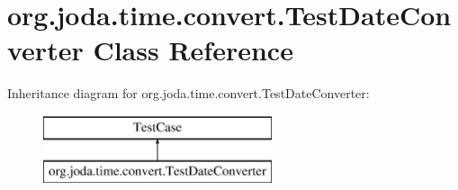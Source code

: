\hypertarget{classorg_1_1joda_1_1time_1_1convert_1_1_test_date_converter}{\section{org.\-joda.\-time.\-convert.\-Test\-Date\-Converter Class Reference}
\label{classorg_1_1joda_1_1time_1_1convert_1_1_test_date_converter}
}
Inheritance diagram for org.\-joda.\-time.\-convert.\-Test\-Date\-Converter\-:\begin{figure}[H]
\begin{center}
\leavevmode
\includegraphics[height=2.000000cm]{classorg_1_1joda_1_1time_1_1convert_1_1_test_date_converter}
\end{center}
\end{figure}
